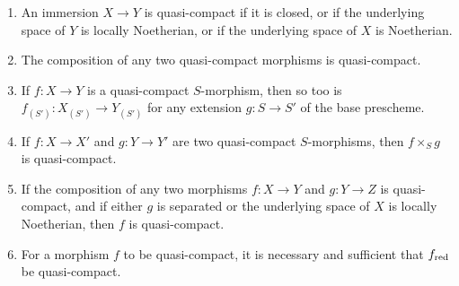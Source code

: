 \begin{prop}[6.6.4]
\label{1.6.6.4}
\medskip\noindent
\begin{enumerate}[label=\emph{(\alph*)}]
    \item An immersion $X\to Y$ is quasi-compact if it is closed, or if the underlying space of $Y$ is locally Noetherian, or if the underlying space of $X$ is Noetherian.
    \item The composition of any two quasi-compact morphisms is quasi-compact.
    \item If $f: X\to Y$ is a quasi-compact $S$-morphism, then so too is $f_{(S')}: X_{(S')}\to Y_{(S')}$ for any extension $g: S\to S'$ of the base prescheme.
    \item If $f:X\to X'$ and $g:Y\to Y'$ are two quasi-compact $S$-morphisms, then $f\times_S g$ is quasi-compact.
    \item If the composition of any two morphisms $f: X\to Y$ and $g:Y\to Z$ is quasi-compact, and if either $g$ is separated or the underlying space of $X$ is locally Noetherian, then $f$ is quasi-compact.
    \item For a morphism $f$ to be quasi-compact, it is necessary and sufficient that $f_{\mathrm{red}}$ be quasi-compact.
\end{enumerate}
\end{prop}

